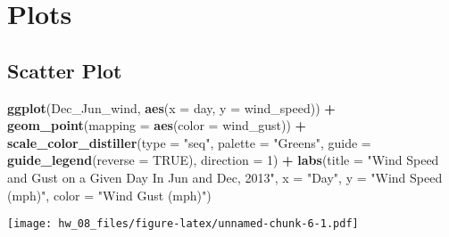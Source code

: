 \documentclass[
]{article}
\newenvironment{Shaded}{\begin{snugshade}}{\end{snugshade}}
\newcommand{\DataTypeTok}[1]{\textcolor[rgb]{0.13,0.29,0.53}{#1}}
\newcommand{\DecValTok}[1]{\textcolor[rgb]{0.00,0.00,0.81}{#1}}
\newcommand{\KeywordTok}[1]{\textcolor[rgb]{0.13,0.29,0.53}{\textbf{#1}}}
\newcommand{\NormalTok}[1]{#1}
\newcommand{\OperatorTok}[1]{\textcolor[rgb]{0.81,0.36,0.00}{\textbf{#1}}}
\newcommand{\OtherTok}[1]{\textcolor[rgb]{0.56,0.35,0.01}{#1}}
\newcommand{\StringTok}[1]{\textcolor[rgb]{0.31,0.60,0.02}{#1}}
\begin{document}
\hypertarget{plots}{%
\section{Plots}\label{plots}}

\hypertarget{scatter-plot}{%
\subsection{Scatter Plot}\label{scatter-plot}}

\begin{Shaded}
\begin{Highlighting}[]
\KeywordTok{ggplot}\NormalTok{(Dec_Jun_wind, }\KeywordTok{aes}\NormalTok{(}\DataTypeTok{x =}\NormalTok{ day, }
                         \DataTypeTok{y =}\NormalTok{ wind_speed)) }\OperatorTok{+}
\StringTok{  }\KeywordTok{geom_point}\NormalTok{(}\DataTypeTok{mapping =} \KeywordTok{aes}\NormalTok{(}\DataTypeTok{color =}\NormalTok{ wind_gust)) }\OperatorTok{+}
\StringTok{  }\KeywordTok{scale_color_distiller}\NormalTok{(}\DataTypeTok{type =} \StringTok{"seq"}\NormalTok{, }
                       \DataTypeTok{palette =} \StringTok{"Greens"}\NormalTok{, }
                       \DataTypeTok{guide =} \KeywordTok{guide_legend}\NormalTok{(}\DataTypeTok{reverse =} \OtherTok{TRUE}\NormalTok{), }
                       \DataTypeTok{direction =} \DecValTok{1}\NormalTok{) }\OperatorTok{+}
\StringTok{  }\KeywordTok{labs}\NormalTok{(}\DataTypeTok{title =} \StringTok{"Wind Speed and Gust on a Given Day In Jun and Dec, 2013"}\NormalTok{, }
       \DataTypeTok{x =} \StringTok{"Day"}\NormalTok{, }
       \DataTypeTok{y =} \StringTok{"Wind Speed (mph)"}\NormalTok{,}
      \DataTypeTok{color =} \StringTok{"Wind Gust (mph)"}\NormalTok{)}
\end{Highlighting}
\end{Shaded}

\texttt{[image: hw\_08\_files/figure-latex/unnamed-chunk-6-1.pdf]}
\end{document}
